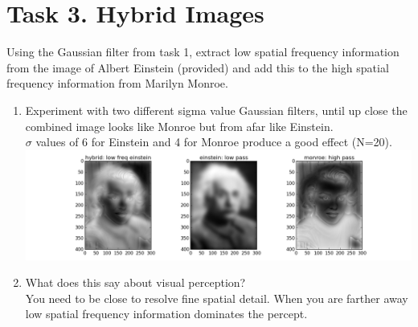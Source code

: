 \documentclass[12pt,english]{scrartcl}
\begin{document}
\section*{Task 3. Hybrid Images}
Using the Gaussian filter from task 1, extract low spatial frequency information from the image of Albert Einstein (provided) and add this to the high spatial frequency information from Marilyn Monroe. \\
\begin{enumerate}
\item Experiment with two different sigma value Gaussian filters, until up close the combined image looks like Monroe but from afar like Einstein. \\
\color{blue} 
$\sigma$ values of 6 for Einstein and 4 for Monroe produce a good effect (N=20). \\
\centering
 \includegraphics[scale=0.4]{task_3_1.png} 

\color{black}
\raggedright
\item What does this say about visual perception? \\
\color{blue}
You need to be close to resolve fine spatial detail. When you are farther away low spatial frequency information dominates the percept. \\
\end{enumerate}
\end{document}
